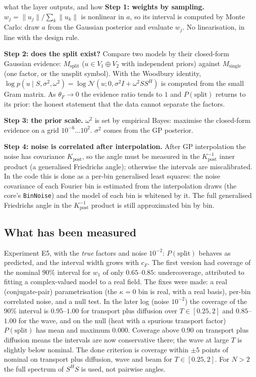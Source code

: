 \documentclass[11pt,a4paper]{article}
\theoremstyle{definition}
\begin{document}
\begin{explained}{what the layer outputs, and how}
\textbf{Step 1: weights by sampling.} $w_j=\|u_j\|/\sum_k\|u_k\|$ is nonlinear in $a$, so its interval is computed by Monte Carlo: draw $a$ from the Gaussian posterior and evaluate $w_j$. No linearisation, in line with the design rule.

\medskip\textbf{Step 2: does the split exist?} Compare two models by their closed-form Gaussian evidence: $M_{\mathrm{split}}$ ($u\in V_1\oplus V_2$ with independent priors) against $M_{\mathrm{single}}$ (one factor, or the unsplit symbol). With the Woodbury identity, $\log p(u\mid S,\sigma^2,\omega^2)=\log\mathcal N(u;0,\sigma^2I+\omega^2SS^{H})$ is computed from the small Gram matrix. As $\theta_F\to0$ the evidence ratio tends to $1$ and $P(\text{split})$ returns to its prior: the honest statement that the data cannot separate the factors.

\medskip\textbf{Step 3: the prior scale.} $\omega^2$ is set by empirical Bayes: maximise the closed-form evidence on a grid $10^{-6}\ldots10^{2}$. $\sigma^2$ comes from the GP posterior.

\medskip\textbf{Step 4: noise is correlated after interpolation.} After GP interpolation the noise has covariance $K_{\mathrm{post}}$, so the angle must be measured in the $K_{\mathrm{post}}^{-1}$ inner product (a generalised Friedrichs angle); otherwise the intervals are miscalibrated. In the code this is done as a per-bin generalised least squares: the noise covariance of each Fourier bin is estimated from the interpolation draws (the core's \texttt{BinNoise}) and the model of each bin is whitened by it. The full generalised Friedrichs angle in the $K_{\mathrm{post}}^{-1}$ product is still approximated bin by bin.
\end{explained}

\subsection{What has been measured}
Experiment E5, with the \emph{true} factors and noise $10^{-2}$: $P(\text{split})$ behaves as predicted, and the interval width grows with $c_F$. The first version had coverage of the nominal $90\%$ interval for $w_1$ of only $0.65$--$0.85$: undercoverage, attributed to fitting a complex-valued model to a real field. The fixes were made: a real (conjugate-pair) parametrisation (the $\kappa=0$ bin is real, with a real basis), per-bin correlated noise, and a null test. In the later log (noise $10^{-2}$) the coverage of the $90\%$ interval is $0.95$--$1.00$ for transport plus diffusion over $T\in[0.25,2]$ and $0.85$--$1.00$ for the wave, and on the null (heat with a spurious transport factor) $P(\text{split})$ has mean and maximum $0.000$. Coverage above $0.90$ on transport plus diffusion means the intervals are now conservative there; the wave at large $T$ is slightly below nominal. The done criterion is coverage within $\pm5$ points of nominal on transport plus diffusion, wave and beam for $T\in[0.25,2]$. For $N>2$ the full spectrum of $S^{H}S$ is used, not pairwise angles.
\end{document}
